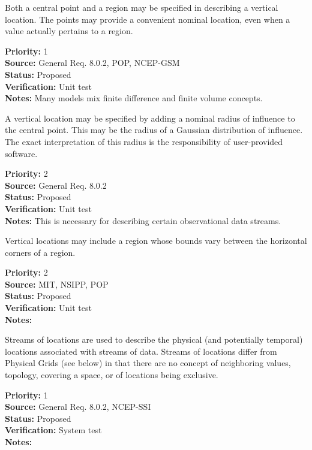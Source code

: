 
  Both a central point and a region may be specified in describing a vertical
location.  The points may provide a convenient nominal location, even when
a value actually pertains to a region.
\begin{reqlist}
{\bf Priority:} 1 \\
{\bf Source:} General Req. 8.0.2, POP, NCEP-GSM \\
{\bf Status:} Proposed \\
{\bf Verification:} Unit test\\
{\bf Notes:} Many models mix finite difference and finite volume concepts.
\end{reqlist}


  A vertical location may be specified by adding a nominal radius of
influence to the central point.  This may be the radius of a Gaussian
distribution of influence. The exact interpretation of this radius is
the responsibility of user-provided software.
\begin{reqlist}
{\bf Priority:} 2 \\
{\bf Source:} General Req. 8.0.2 \\
{\bf Status:} Proposed \\
{\bf Verification:} Unit test\\
{\bf Notes:} This is necessary for describing certain observational data streams.
\end{reqlist}


  Vertical locations may include a region whose bounds vary between the
horizontal corners of a region.
\begin{reqlist}
{\bf Priority:} 2 \\
{\bf Source:} MIT, NSIPP, POP \\
{\bf Status:} Proposed \\
{\bf Verification:} Unit test\\
{\bf Notes:} 
\end{reqlist}


Streams of locations are used to describe the physical (and potentially temporal)
locations associated with streams of data.  Streams of locations differ from
Physical Grids (see below) in that there are no concept of neighboring values,
topology, covering a space, or of locations being exclusive.
\begin{reqlist}
{\bf Priority:} 1 \\
{\bf Source:} General Req. 8.0.2, NCEP-SSI \\
{\bf Status:} Proposed \\
{\bf Verification:} System test\\
{\bf Notes:} 
\end{reqlist}

